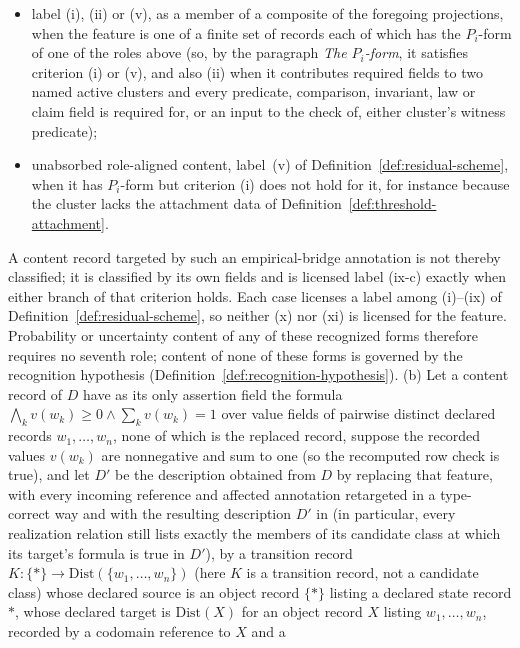 \begin{proposition}
\begin{itemize}[topsep=2pt,itemsep=1pt]
  \item label (i), (ii) or (v), as a member of a composite of the foregoing
    projections, when the feature is one of a finite set of records each of which has the \(P_i\)-form of one of the roles above (so, by the paragraph
    \emph{The \(P_i\)-form}, it satisfies criterion (i) or (v), and also (ii)
    when it contributes required fields to two named active clusters and every
    predicate, comparison, invariant, law or claim field is required for, or an
    input to the check of, either cluster's witness predicate);
  \item unabsorbed role-aligned content, label~(v) of
    Definition~\ref{def:residual-scheme}, when it has \(P_i\)-form but
    criterion (i) does not hold for it, for instance because the cluster lacks
    the attachment data of Definition~\ref{def:threshold-attachment}.
\end{itemize}
A content record targeted by such an empirical-bridge annotation is not thereby classified; it is classified by its own fields and is licensed label (ix-c) exactly when either branch of that criterion holds.
Each case licenses a label among (i)--(ix) of
Definition~\ref{def:residual-scheme}, so neither (x) nor (xi) is licensed for
the feature. Probability or uncertainty content of any of these recognized forms therefore
requires no seventh role; content of none of these forms is governed by the
recognition hypothesis (Definition~\ref{def:recognition-hypothesis}).
\textup{(b)} Let a content record of \(D\) have as its only assertion field the formula \(\bigwedge_k v(w_k)\ge0\wedge\sum_k v(w_k)=1\) over value fields of pairwise distinct declared records \(w_1,\dots,w_n\), none of which is the replaced record, suppose the recorded values \(v(w_k)\) are nonnegative and sum to one (so the recomputed row check is true), and let \(D'\) be the description obtained from \(D\) by replacing that
feature, with every incoming reference and affected annotation retargeted in a
type-correct way and with the resulting description \(D'\) in \FATCD{} (in particular, every realization relation still lists exactly the members of its candidate class at which its target's formula is true in \(D'\)), by a transition record \(K:\{*\}\to\mathrm{Dist}(\{w_1,\dots,w_n\})\) (here \(K\) is a transition record, not a candidate class)
whose declared source is an object record \(\{*\}\) listing a declared state
record \(*\), whose declared target is \(\mathrm{Dist}(X)\) for an object record
\(X\) listing \(w_1,\dots,w_n\), recorded by a codomain reference to \(X\) and a

\end{proposition}
